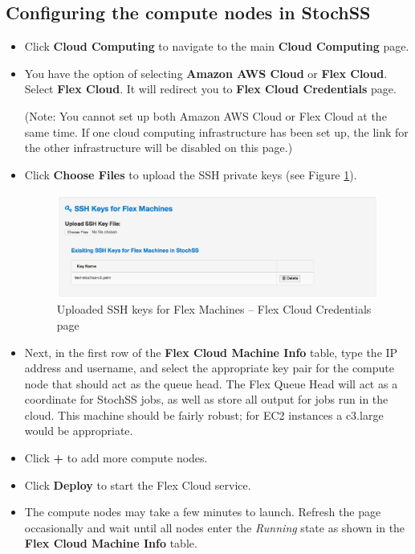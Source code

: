 \subsection{Configuring the compute nodes in StochSS}

\begin{itemize}
\item Click \textbf{Cloud Computing} to navigate to the main \textbf{Cloud Computing} page.
\item You have the option of selecting \textbf{Amazon AWS Cloud} or \textbf{Flex Cloud}. Select \textbf{Flex Cloud}. It will redirect you to \textbf{Flex Cloud Credentials} page. 

(Note: You cannot set up both Amazon AWS Cloud or Flex Cloud at the same time. If one cloud computing infrastructure has been set up, the link for the other infrastructure will be disabled on this page.)


\item Click \textbf{Choose Files} to upload the SSH private keys (see Figure \ref{fig:2}).

\begin{figure}[!ht]
\centering
\includegraphics[scale=0.45]{T7/T7_fig_flex_uploaded_ssh_keys.png}
\caption{Uploaded SSH keys for Flex Machines -- Flex Cloud Credentials page}
\label{fig:2}
\end{figure}

\item Next, in the first row of the \textbf{Flex Cloud Machine Info} table, type the IP address and username, and select the appropriate key pair for the compute node that should act as the queue head. The Flex Queue Head will act as a coordinate for StochSS jobs, as well as store all output for jobs run in the cloud. This machine should be fairly robust; for EC2 instances a c3.large would be appropriate.
\item Click \textbf{+} to add more compute nodes. %
\item Click \textbf{Deploy} to start the Flex Cloud service.
\item The compute nodes may take a few minutes to launch. Refresh the page occasionally and wait until all nodes enter the \emph{Running} state as shown in the \textbf{Flex Cloud Machine Info} table.


\end{itemize}

